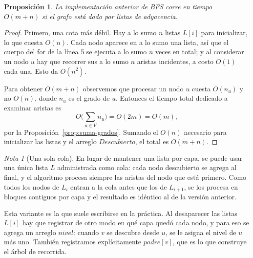 \documentclass[12pt, spanish, oneside, openany]{book}
\theoremstyle{uprightplain}
\newtheorem{proposicion}[teorema]{Proposición}
\theoremstyle{definition}
\theoremstyle{remark}
\newtheorem{nota}[teorema]{Nota}
\theoremstyle{definition}
\begin{document}
\begin{proposicion}
\label{prop:bfs-tiempo}
La implementación anterior de BFS corre en tiempo $O(m+n)$ si el grafo está dado por listas de adyacencia.
\end{proposicion}
\begin{proof}
Primero, una cota más débil. Hay a lo sumo $n$ listas $L[i]$ para inicializar, lo que cuesta $O(n)$. Cada nodo aparece en a lo sumo una lista, así que el cuerpo del for de la línea 5 se ejecuta a lo sumo $n$ veces en total; y al considerar un nodo $u$ hay que recorrer sus a lo sumo $n$ aristas incidentes, a costo $O(1)$ cada una. Esto da $O(n^2)$.

Para obtener $O(m+n)$ observemos que procesar un nodo $u$ cuesta $O(n_u)$ y no $O(n)$, donde $n_u$ es el grado de $u$. Entonces el tiempo total dedicado a examinar aristas es
\[
O\Big(\sum_{u\in V} n_u\Big) = O(2m) = O(m),
\]
por la Proposición~\ref{prop:suma-grados}. Sumando el $O(n)$ necesario para inicializar las listas y el arreglo $\mathit{Descubierto}$, el total es $O(m+n)$.
\end{proof}

\begin{nota}[Una sola cola]
En lugar de mantener una lista por capa, se puede usar una única lista $L$ administrada como cola: cada nodo descubierto se agrega al final, y el algoritmo procesa siempre las aristas del nodo que está primero. Como todos los nodos de $L_i$ entran a la cola antes que los de $L_{i+1}$, se los procesa en bloques contiguos por capa y el resultado es idéntico al de la versión anterior.
\end{nota}

Esta variante es la que suele escribirse en la práctica. Al desaparecer las listas $L[i]$ hay que registrar de otro modo en qué capa quedó cada nodo, y para eso se agrega un arreglo $\mathit{nivel}$: cuando $v$ se descubre desde $u$, se le asigna el nivel de $u$ más uno. También registramos explícitamente $\mathit{padre}[v]$, que es lo que construye el árbol de recorrida.
\end{document}
